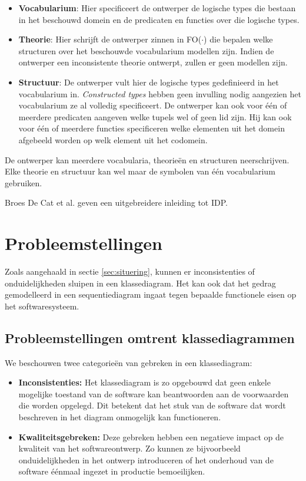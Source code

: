 \begin{itemize}
	\item \textbf{Vocabularium}: Hier specificeert de ontwerper de logische types die bestaan in het beschouwd domein en de predicaten en functies over die logische types.
	\item \textbf{Theorie}: Hier schrijft de ontwerper zinnen in FO($\cdot$) die bepalen welke structuren over het beschouwde vocabularium modellen zijn. Indien de ontwerper een inconsistente theorie ontwerpt, zullen er geen modellen zijn.
	\item \textbf{Structuur}: De ontwerper vult hier de logische types gedefinieerd in het vocabularium in. \textit{Constructed types} hebben geen invulling nodig aangezien het vocabularium ze al volledig specificeert. De ontwerper kan ook voor \'e\'en of meerdere predicaten aangeven welke tupels wel of geen lid zijn. Hij kan ook voor \'e\'en of meerdere functies specificeren welke elementen uit het domein afgebeeld worden op welk element uit het codomein.
\end{itemize}

De ontwerper kan meerdere vocabularia, theorie\"en en structuren neerschrijven. Elke theorie en structuur kan wel maar de symbolen van \'e\'en vocabularium gebruiken.

Broes De Cat et al.\cite{DeCatBroes2014PLaa} geven een uitgebreidere inleiding tot IDP.

\section{Probleemstellingen}\label{sec:research-q}

Zoals aangehaald in sectie \ref{sec:situering}, kunnen er inconsistenties of onduidelijkheden sluipen in een klassediagram. Het kan ook dat het gedrag gemodelleerd in een sequentiediagram ingaat tegen bepaalde functionele eisen op het softwaresysteem.

\subsection{Probleemstellingen omtrent klassediagrammen}

We beschouwen twee categorie\"en van gebreken in een klassediagram:

\begin{itemize}
	\item \textbf{Inconsistenties:} Het klassediagram is zo opgebouwd dat geen enkele mogelijke toestand van de software kan beantwoorden aan de voorwaarden die worden opgelegd. Dit betekent dat het stuk van de software dat wordt beschreven in het diagram onmogelijk kan functioneren.
	\item \textbf{Kwaliteitsgebreken:} Deze gebreken hebben een negatieve impact op de kwaliteit van het softwareontwerp. Zo kunnen ze bijvoorbeeld onduidelijkheden in het ontwerp introduceren of het onderhoud van de software \'e\'enmaal ingezet in productie bemoeilijken.
\end{itemize}

